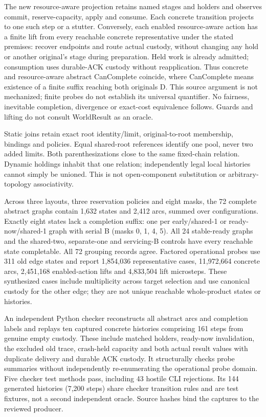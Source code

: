 \documentclass[11pt,a4paper]{article}
\theoremstyle{definition}
\theoremstyle{remark}
\begin{document}
The new resource-aware projection retains named stages and holders and observes commit, reserve-capacity, apply and consume. Each concrete transition projects to one such step or a stutter. Conversely, each enabled resource-aware action has a finite lift from every reachable concrete representative under the stated premises: recover endpoints and route actual custody, without changing any hold or another original's stage during preparation. Held work is already admitted; consumption uses durable-ACK custody without reapplication. Thus concrete and resource-aware abstract CanComplete coincide, where CanComplete means existence of a finite suffix reaching both originals D. This source argument is not mechanized; finite probes do not establish its universal quantifier. No fairness, inevitable completion, divergence or exact-cost equivalence follows. Guards and lifting do not consult WorldResult as an oracle.

Static joins retain exact root identity/limit, original-to-root membership, bindings and policies. Equal shared-root references identify one pool, never two added limits. Both parenthesizations close to the same fixed-chain relation. Dynamic holdings inhabit that one relation; independently legal local histories cannot simply be unioned. This is not open-component substitution or arbitrary-topology associativity.

Across three layouts, three reservation policies and eight masks, the 72 complete abstract graphs contain 1,632 states and 2,412 arcs, summed over configurations. Exactly eight states lack a completion suffix: one per early/shared-1 or ready-now/shared-1 graph with serial B (masks 0, 1, 4, 5). All 24 stable-ready graphs and the shared-two, separate-one and servicing-B controls have every reachable state completable. All 72 grouping records agree. Factored operational probes use 311 old edge states and report 1,854,036 representative cases, 11,972,664 concrete arcs, 2,451,168 enabled-action lifts and 4,833,504 lift microsteps. These synthesized cases include multiplicity across target selection and use canonical custody for the other edge; they are not unique reachable whole-product states or histories.

An independent Python checker reconstructs all abstract arcs and completion labels and replays ten captured concrete histories comprising 161 steps from genuine empty custody. These include matched holders, ready-now invalidation, the excluded old trace, crash-held capacity and both actual result values with duplicate delivery and durable ACK custody. It structurally checks probe summaries without independently re-enumerating the operational probe domain. Five checker test methods pass, including 43 hostile CLI rejections. Its 144 generated histories (7,200 steps) share checker transition rules and are test fixtures, not a second independent oracle. Source hashes bind the captures to the reviewed producer.
\end{document}
